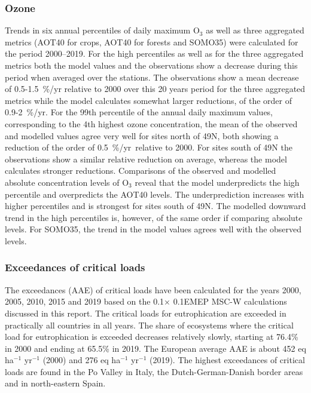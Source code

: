 \subsubsection*{Ozone}
Trends in six annual percentiles of daily maximum O$_3$ as well as three aggregated metrics (AOT40 for crops, AOT40 for forests and SOMO35) were calculated for the period 2000--2019. For the high percentiles as well as for the three aggregated metrics both the model values and the observations show a decrease during this period when averaged over the stations. The observations show a mean decrease of 0.5-1.5~\%/yr relative to 2000 over this 20 years period for the three aggregated metrics while the model calculates somewhat larger reductions, of the order of 0.9-2~\%/yr. For the 99th percentile of the annual daily maximum values, corresponding to the 4th highest ozone concentration, the mean of the observed and modelled values agree very well for sites north of 49\degrees N, both showing a reduction of the order of 
0.5~\%/yr\ relative to 2000. For sites south of 49\degrees N the observations show a similar relative reduction on average, whereas the model calculates stronger reductions. Comparisons of the observed and modelled absolute concentration levels of O$_3$ reveal that the model underpredicts the high percentile and overpredicts the AOT40 levels. The underprediction increases with higher percentiles and is strongest for sites south of 49\degrees N. The modelled downward trend in the high percentiles is, however, of the same order if comparing absolute levels. For SOMO35, the trend in the model values agrees well with the observed levels.

\subsubsection*{Exceedances of critical loads}
The exceedances (AAE) of critical loads have been calculated for the years 2000, 2005, 2010, 2015 and 2019 based on the 0.1\degrees$\times$ 0.1\degrees EMEP MSC-W calculations discussed in this report. The critical loads for eutrophication are exceeded in practically all countries in all years. The share of ecosystems where the critical load for eutrophication is exceeded decreases relatively slowly, starting at 76.4\% in 2000 and ending at 65.5\% in 2019. The European average AAE is about 452 eq ha$^{-1}$ yr$^{-1}$ (2000) and 276 eq
ha$^{-1}$ yr$^{-1}$ (2019). The highest exceedances of critical loads are found in the Po Valley in Italy, the
Dutch-German-Danish border areas and in north-eastern Spain.


